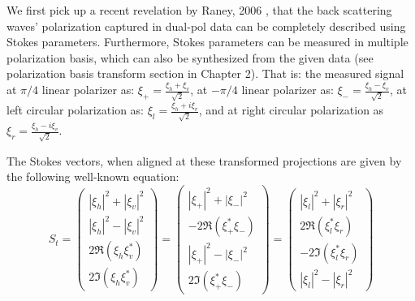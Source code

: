 We first pick up a recent revelation by Raney, 2006 \cite{Raney_2006_IGARSS}, that the back scattering waves' polarization captured in dual-pol data can be completely described using Stokes parameters.
Furthermore, Stokes parameters can be measured in multiple polarization basis, which can also be synthesized from the given data (see polarization basis transform section in Chapter 2).
That is:
	the measured signal at $\pi/4$ linear polarizer as: $\xi_+ = \frac{\xi_h + \xi_v}{\sqrt{2}}$,
	at $-\pi/4$ linear polarizer as: $\xi_- = \frac{\xi_h - \xi_v}{\sqrt{2}}$, 
	at left circular polarization as: $\xi_l = \frac{\xi_h + i \xi_v}{\sqrt{2}}$, 
	and at right circular polarization as $\xi_r = \frac{\xi_h - i \xi_v}{\sqrt{2}}$.

The Stokes vectors, when aligned at these transformed projections are given by the following well-known equation:
\begin{equation}
S_t = \left(
\begin{array}{c}
 |\xi_h|^2 + |\xi_v|^2 \\
 |\xi_h|^2 - |\xi_v|^2 \\
 2 \Re( \xi_h \xi_v^* ) \\
 2 \Im( \xi_h \xi_v^* ) 
\end{array}
\right)
= \left(
\begin{array}{c}
 |\xi_+|^2 + |\xi_-|^2 \\
 -2 \Re( \xi_+^* \xi_- ) \\
 |\xi_+|^2 - |\xi_-|^2 \\
 2 \Im( \xi_+^* \xi_- ) 
\end{array}
\right)
= \left(
\begin{array}{c}
 |\xi_l|^2 + |\xi_r|^2 \\
 2 \Re( \xi_l^* \xi_r ) \\
 -2 \Im( \xi_l^* \xi_r ) \\ 
 |\xi_l|^2 - |\xi_r|^2 
\end{array}
\right)  
\end{equation}

